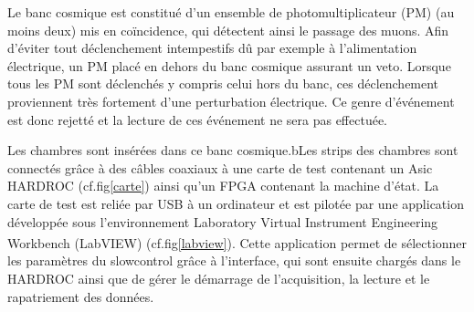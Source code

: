 Le banc cosmique est constitué d'un ensemble de photomultiplicateur (PM) (au moins deux) mis en coïncidence, qui détectent ainsi le passage des muons. Afin d'éviter tout déclenchement intempestifs dû par exemple à l'alimentation électrique, un PM placé en dehors du banc cosmique assurant un veto. Lorsque tous les PM sont déclenchés y compris celui hors du banc, ces déclenchement proviennent très fortement d'une perturbation électrique. Ce genre d'événement est donc rejetté et la lecture de ces événement ne sera pas effectuée.

Les chambres sont insérées dans ce banc cosmique.bLes strips des chambres sont connectés grâce à des câbles coaxiaux à une carte de test contenant un Asic HARDROC (cf.fig\ref{carte}) ainsi qu'un FPGA contenant la machine d'état. La carte de test est reliée par USB à un ordinateur et est pilotée par une application développée sous l'environnement Laboratory Virtual Instrument Engineering Workbench (LabVIEW\textsuperscript{\textregistered}) (cf.fig\ref{labview}). Cette application permet de sélectionner les paramètres du slowcontrol grâce à l'interface, qui sont ensuite chargés dans le HARDROC ainsi que de gérer le démarrage de l'acquisition, la lecture et le rapatriement des données. 


